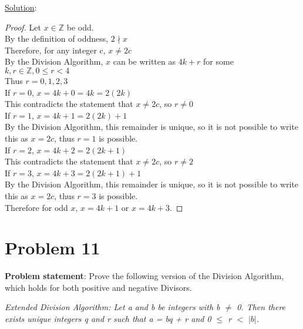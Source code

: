 \documentclass{article} %
\begin{document}
\underline{Solution}: 
\begin{addmargin}[1em]{0em}
\begin{proof} \hfill \break
Let $x \in \mathbb{Z}$ be odd.
\\By the definition of oddness, $2 \nmid x$
\\Therefore, for any integer c, $x \neq 2c$
\\By the Division Algorithm, $x$ can be written as $4k + r$ for some $k, r \in \mathbb{Z}, 0 \leq r < 4 $
\\Thus $r = 0,1,2,3$
\\If $r = 0$, $x = 4k + 0 = 4k = 2(2k)$
\\This contradicts the statement that $x \neq 2c$, so $ r \neq 0$
\\If $r = 1$, $x = 4k + 1 = 2(2k) + 1$
\\By the Division Algorithm, this remainder is unique, so it is not possible to write this as $x = 2c$, thus $r = 1$ is possible.
\\If $r = 2$, $x = 4k + 2 = 2(2k + 1)$
\\This contradicts the statement that $x \neq 2c$, so $ r \neq 2$
\\If $r = 3$, $x = 4k + 3 = 2(2k + 1) + 1$
\\By the Division Algorithm, this remainder is unique, so it is not possible to write this as $x = 2c$, thus $r = 3$ is possible.
\\Therefore for odd $x$, $x = 4k + 1$ or $x = 4k + 3$.
\end{proof}
\end{addmargin}

\newpage
\section*{Problem 11}

\textbf{Problem statement}:
Prove the following version of the Division Algorithm, which holds for both positive and negative Divisors.
\\ \begin{addmargin}[1em]{0em}
\textit{Extended Division Algorithm: Let a and b be integers with b $\neq$ 0.  Then there exists unique integers q and r such that a = bq + r and 0 $\leq$ r $<$ $|b|$.}
\end{addmargin} \hfill {}
\\
\end{document}
